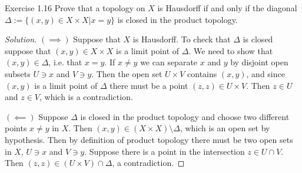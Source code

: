 \iffalse\begin{remark}\leavevmode
	A closed set in product topology is a union of products of closed sets, i.e. closed sets in $M \times N$ are obtained as unions $\bigcup_{\alpha} F_\alpha \times F'_\alpha$ where $F_\alpha$ is closed in $M$ and $F'_\alpha$ is closed in $N$.

	Indeed, the complement of a closed set $\mathcal{F} \subset M\times N$ is open in the product, so by definition it is a union of products of open sets $\mathcal{U}=\bigcup_{\alpha} U_\alpha \times V_\alpha$ with $U_\alpha$ in $M$ and $V_\alpha$ in $N$. The complement of $\mathcal{U}$ is 
\begin{align*}
	\mathcal{F}&=(M\times N)\setminus \mathcal{U}\\
&=(M\times N)\setminus \left( \bigcup_{\alpha} U_\alpha\times V_\alpha \right) \\
& =\bigcap_\alpha (M\setminus U_\alpha)\times (N\setminus V_\alpha),
\end{align*}
which is a union of products of closed sets as desired.
\end{remark}\fi

\begin{thing4}{Exercise 1.16}\leavevmode
	Prove that a topology on $X$ is Hausdorff if and only if the diagonal $\Delta:=\{(x,y) \in X \times X|x=y\}$ is closed in the product topology.
\end{thing4}

\begin{proof}[Solution]\leavevmode
	$(\implies )$ Suppose that $X$ is Hausdorff. To check that $\Delta$ is closed suppose that $(x,y) \in X \times X$ is a limit point of $\Delta$. We need to show that $(x,y) \in \Delta$, i.e. that $x=y$. If $x \neq y$ we can separate $x$ and  $y$ by disjoint open subsets $U \ni x$ and  $V \ni y$. Then the open set $U \times V$ contains $(x,y)$,  and since $(x,y)$ is a limit point of  $\Delta$ there must be a point $(z,z) \in U \times V$. Then $z \in U$ and $z \in V$, which is a contradiction.

$(\impliedby)$ Suppose $\Delta$ is closed in the product topology and choose two different points $x \neq y$ in $X$. Then $(x,y) \in (X \times X)\setminus \Delta$, which is an open set by hypothesis. Then by definition of product topology there must be two open sets in $X$,  $U \ni x$ and $V \ni y$. Suppose there is a point in the intersection $z \in U \cap V$. Then $(z,z) \in (U \times V) \cap \Delta$, a contradiction.
\end{proof}

